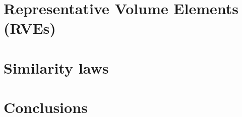 \documentclass[a4paper,fleqn]{cas-dc}
\begin{document}
\section{Representative Volume Elements (RVEs)}






\section{Similarity laws}



\section{Conclusions}




%





%
%
\end{document}
